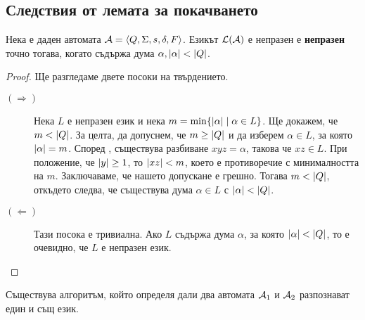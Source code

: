 \subsection{Следствия от лемата за покачването}

\begin{prop}
  Нека е даден автомата $\mathcal{A} = \langle{Q,\Sigma,s,\delta,F}\rangle$.
  Езикът $\mathcal{L}(\mathcal{A})$ е непразен е {\bf непразен} точно тогава, когато съдържа дума $\alpha, \lvert{\alpha}\rvert < \lvert{Q}\rvert$.
\end{prop}
\begin{proof}
  Ще разгледаме двете посоки на твърдението.
  \begin{description}
  \item[$(\Rightarrow)$]
    Нека $L$ е непразен език и нека $m = \min\{\lvert{\alpha}\rvert \mid \alpha \in L\}$.
    Ще докажем, че $m < \lvert{Q}\rvert$.    
    За целта, да допуснем, че $m \geq \lvert{Q}\rvert$ и да изберем $\alpha \in L$, за която $\lvert{\alpha}\rvert = m$.
    Според , съществува разбиване $xyz = \alpha$, 
    такова че $xz \in L$.
    При положение, че $\lvert{y}\rvert \geq 1$, то $\lvert{xz}\rvert < m$, което 
    е противоречие с минималността на $m$.
    Заключаваме, че нашето допускане е грешно. Тогава $m < \lvert{Q}\rvert$, откъдето следва, че 
    съществува дума $\alpha \in L$ с $\lvert{\alpha}\rvert < \lvert{Q}\rvert$.
  \item[$(\Leftarrow)$]
    Тази посока е тривиална.
    Ако $L$ съдържа дума $\alpha$, за която $\lvert{\alpha}\rvert < \lvert{Q}\rvert$,
    то е очевидно, че $L$ е непразен език.
  \end{description}
\end{proof}

\begin{cor}
  Съществува алгоритъм, който определя дали два автомата $\mathcal{A}_1$ и $\mathcal{A}_2$ разпознават един и същ език.
\end{cor}

